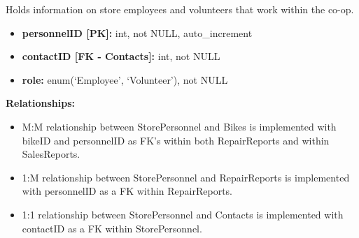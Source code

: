 \documentclass{article}
\begin{document}
\vspace{0.5cm}

\begin{tcolorbox}[colback=secondarycolor, colframe=primarycolor, title=\textbf{StorePersonnel Table}]
Holds information on store employees and volunteers that work within the co-op.
\vspace{0.2cm}

\begin{itemize}
  \item \textbf{personnelID [PK]:} int, not NULL, auto\_increment
  \item \textbf{contactID [FK - Contacts]:} int, not NULL
  \item \textbf{role:} enum(`Employee', `Volunteer'), not NULL
\end{itemize}
\vspace{0.2cm}

\textbf{Relationships:}
\vspace{0.2cm}
\begin{itemize}
  \item M:M relationship between StorePersonnel and Bikes is implemented with bikeID and personnelID as FK's within both RepairReports and within SalesReports.
  \item 1:M relationship between StorePersonnel and RepairReports is implemented with personnelID as a FK within RepairReports.
    \item 1:1 relationship between StorePersonnel and Contacts is implemented with contactID as a FK within StorePersonnel.
\end{itemize}
\end{tcolorbox}

\vspace{0.5cm}
\end{document}

